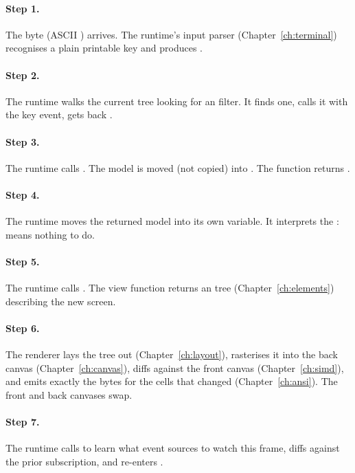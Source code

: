 \paragraph{Step 1.} The byte  (ASCII \code{+}) arrives.
The runtime's input parser (Chapter~\ref{ch:terminal}) recognises a
plain printable key and produces .

\paragraph{Step 2.} The runtime walks the current  tree
looking for an  filter. It finds one, calls it with the
key event, gets back .

\paragraph{Step 3.} The runtime calls . The model is moved (not copied) into . The
function returns .

\paragraph{Step 4.} The runtime moves the returned model into its
own  variable. It interprets the : 
means nothing to do.

\paragraph{Step 5.} The runtime calls . The
view function returns an  tree (Chapter~\ref{ch:elements})
describing the new screen.

\paragraph{Step 6.} The renderer lays the tree out
(Chapter~\ref{ch:layout}), rasterises it into the back canvas
(Chapter~\ref{ch:canvas}), diffs against the front canvas
(Chapter~\ref{ch:simd}), and emits exactly the bytes for the cells
that changed (Chapter~\ref{ch:ansi}). The front and back canvases
swap.

\paragraph{Step 7.} The runtime calls  to
learn what event sources to watch this frame, diffs against the
prior subscription, and re-enters .

